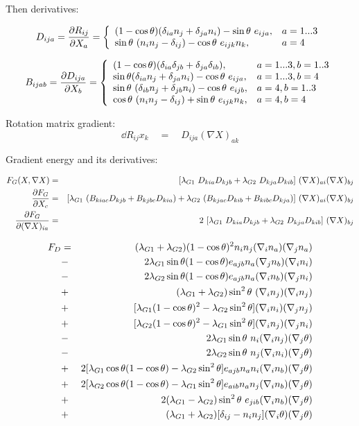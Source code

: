 \documentclass[a4paper]{article}
\begin{document}
Then derivatives:

$$
D_{ija} = \frac{\partial R_{ij}}{\partial X_a} = \left\{
\begin{array}{ll}
(1-\cos\theta) (\delta_{ia} n_j + \delta_{ja} n_i) - \sin\theta\ e_{ija}, & a=1...3\\
\sin\theta\ (n_i n_j - \delta_{ij}) - \cos\theta\ e_{ijk} n_k, & a=4\\
\end{array}
\right.
$$

$$
B_{ijab} = \frac{\partial D_{ija}}{\partial X_b} = \left\{
\begin{array}{ll}
(1-\cos\theta) (\delta_{ia} \delta_{jb} + \delta_{ja} \delta_{ib}), & a=1...3, b=1..3\\
\sin\theta (\delta_{ia} n_j + \delta_{ja} n_i) - \cos\theta\ e_{ija}, & a=1...3, b=4\\
\sin\theta\ (\delta_{ib} n_j + \delta_{jb} n_i) - \cos\theta\ e_{ijb}, & a=4, b=1..3\\
\cos\theta\ (n_i n_j - \delta_{ij}) + \sin\theta\ e_{ijk} n_k, & a=4, b=4\\
\end{array}
\right.
$$


Rotation matrix gradient:
$$
\dd{R_{ij}}{x_k} \quad = \quad D_{ija} (\nabla X)_{ak}
$$

Gradient energy and its derivatives:

\begin{eqnarray*}
F_{G}(X,\nabla X) &=&
  [\lambda_{G1}\ D_{kia}D_{kjb} + \lambda_{G2}\ D_{kja}D_{kib}]
  \ (\nabla X)_{ai} (\nabla X)_{bj}\\
\frac{\partial F_{G}}{\partial X_c} &=&
  [\lambda_{G1}\ (B_{kiac}D_{kjb} + B_{kjbc} D_{kia}) +
  \lambda_{G2}\ (B_{kjac}D_{kib} + B_{kibc} D_{kja})]
  \ (\nabla X)_{ai} (\nabla X)_{bj}\\
\frac{\partial F_{G}}{\partial (\nabla X)_{ia}} &=&
  2\ [ \lambda_{G1}\ D_{kia}D_{kjb} + \lambda_{G2}\ D_{kja}D_{kib}]
  \ (\nabla X)_{bj}\\
\end{eqnarray*}

\begin{eqnarray*}
F_D
&=& \lgs(1-\ct)^2 n_i n_j   (\nabla_i n_a)(\nabla_j n_a)\\
%
&-& 2\lga\st(1-\ct) e_{ajb} n_a (\nabla_j n_b)(\nabla_i n_i)\\
&-& 2\lgb\st(1-\ct) e_{ajb} n_a (\nabla_i n_b)(\nabla_j n_i)\\
%
&+& \lgs\sts\                 (\nabla_i n_j)(\nabla_i n_j)\\
&+& [\lga(1-\ct)^2-\lgb\sts]  (\nabla_i n_i)(\nabla_j n_j)\\
&+& [\lgb(1-\ct)^2-\lga\sts]  (\nabla_i n_j)(\nabla_j n_i)\\
%
&-& 2\lga\st\ n_i  (\nabla_i n_j)(\nabla_j \theta)\\
&-& 2\lgb\st\ n_j  (\nabla_i n_i)(\nabla_j \theta)\\
&+& 2[\lga\ct(1-\ct)-\lgb\sts] e_{ajb} n_a n_i (\nabla_i n_b)(\nabla_j \theta)\\
&+& 2[\lgb\ct(1-\ct)-\lga\sts] e_{aib} n_a n_j (\nabla_i n_b)(\nabla_j \theta)\\
&+& 2\lgd\sts\ e_{jib} (\nabla_i n_b)(\nabla_j \theta)\\
%
&+& \lgs[\delta_{ij} - n_i n_j] (\nabla_i \theta) (\nabla_j \theta)\\
\end{eqnarray*}
\end{document}
